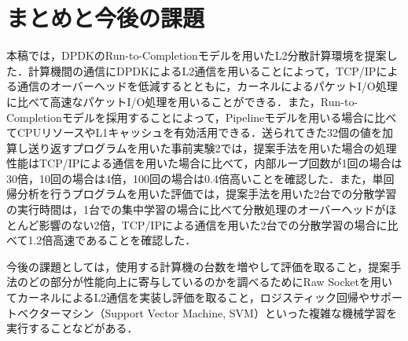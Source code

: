 \section{まとめと今後の課題}
\label{sec:Conclusion}
本稿では，DPDKのRun-to-Completionモデルを用いたL2分散計算環境を提案した．計算機間の通信にDPDKによるL2通信を用いることによって，TCP/IPによる通信のオーバーヘッドを低減するとともに，カーネルによるパケットI/O処理に比べて高速なパケットI/O処理を用いることができる．また，Run-to-Completionモデルを採用することによって，Pipelineモデルを用いる場合に比べてCPUリソースやL1キャッシュを有効活用できる．送られてきた32個の値を加算し送り返すプログラムを用いた事前実験2では，提案手法を用いた場合の処理性能はTCP/IPによる通信を用いた場合に比べて，内部ループ回数が1回の場合は30倍，10回の場合は4倍，100回の場合は0.4倍高いことを確認した．また，単回帰分析を行うプログラムを用いた評価では，提案手法を用いた2台での分散学習の実行時間は，1台での集中学習の場合に比べて分散処理のオーバーヘッドがほとんど影響のない2倍，TCP/IPによる通信を用いた2台での分散学習の場合に比べて1.2倍高速であることを確認した．

今後の課題としては，使用する計算機の台数を増やして評価を取ること，提案手法のどの部分が性能向上に寄与しているのかを調べるためにRaw Socketを用いてカーネルによるL2通信を実装し評価を取ること，ロジスティック回帰やサポートベクターマシン（Support Vector Machine, SVM）といった複雑な機械学習を実行することなどがある．
